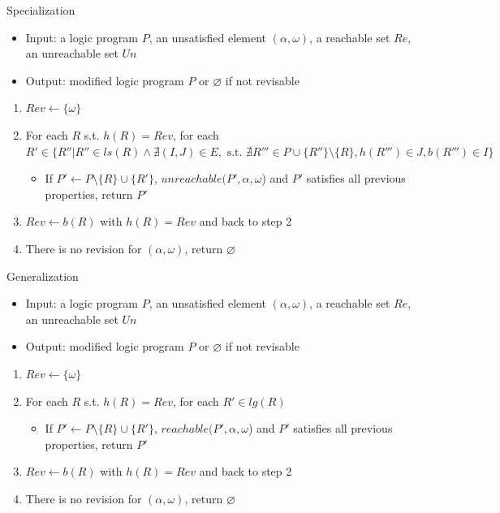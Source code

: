 \documentclass[8pt]{beamer}
\begin{document}
\begin{frame}{Specialization}
    \begin{itemize}
        \item Input: a logic program $P$, an unsatisfied element $(\alpha,\omega)$, a reachable set $Re$, an unreachable set $Un$%
        \item Output: modified logic program $P$ or $\varnothing$ if not revisable
    \end{itemize}
    \begin{enumerate}
        \item $Rev\gets\{\omega\}$
        \item For each $R$ s.t. $h(R)=Rev$, for each $R'\in\{R''|R''\in ls(R)\land \nexists (I,J)\in E, \text{ s.t. } \nexists R'''\in P\cup \{R''\}\setminus \{R\}, h(R''')\in J, b(R''')\in I\}$
        \begin{itemize}
            \item If $P' \gets P \setminus \{R\} \cup \{R'\}$, $unreachable(P',\alpha,\omega$) and $P'$ satisfies all previous properties, return $P'$
        \end{itemize}
        \item $Rev\gets b(R)$ with $h(R)=Rev$ and back to step 2
        \item There is no revision for $(\alpha,\omega)$, return $\varnothing$
    \end{enumerate}
    
\end{frame}

\begin{frame}{Generalization}
    \begin{itemize}
        \item Input: a logic program $P$, an unsatisfied element $(\alpha,\omega)$, a reachable set $Re$, an unreachable set $Un$
        \item Output: modified logic program $P$ or $\varnothing$ if not revisable
    \end{itemize}
    \begin{enumerate}
        \item $Rev\gets\{\omega\}$
        \item For each $R$ s.t. $h(R)=Rev$, for each $R'\in lg(R)$
        \begin{itemize}
            \item If $P' \gets P \setminus \{R\} \cup \{R'\}$, $reachable(P',\alpha,\omega$) and $P'$ satisfies all previous properties, return $P'$
        \end{itemize}
        \item $Rev\gets b(R)$ with $h(R)=Rev$ and back to step 2
        \item There is no revision for $(\alpha,\omega)$, return $\varnothing$
    \end{enumerate}
\end{frame}
\end{document}
